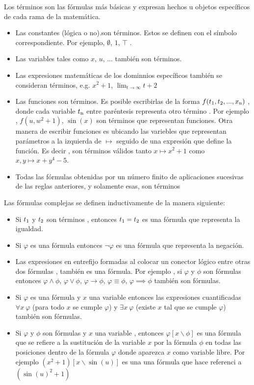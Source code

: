 Los términos son las fórmulas más básicas y expresan hechos u objetos específicos de cada rama de la matemática.

\begin{itemize}
	\item{Las constantes (lógica o no).son términos. Estos se definen con el símbolo correspondiente.  Por ejemplo, $\emptyset$, $1$, $\top$ .}
	\item{Las variables tales como $x$, $u$, ... también son términos.}
	\item{Las expresiones matemáticas de los dominnios específicos también se consideran términos, e.g. $x^2 + 1$, $\lim_{t \to \infty}{t+2}$}
	\item{Las funciones son términos. Es posible escribirlas de la forma $f(t\textsubscript{1}, t\textsubscript{2}, ..., x\textsubscript{n})$ , donde cada variable $t\textsubscript{n}$ entre paréntesis representa otro término . Por ejemplo , $f(u,w^2+1)$, $\sin(x)$ son términos que representan funciones. Otra manera de escribir funciones es ubicando las variebles que representan parámetros a la izquierda de $\mapsto$ seguido de una expresión que define la función. Es decir , son términos válidos tanto $x \mapsto x^2+1$ como $x, y \mapsto x+y^4-5$.}
	\item{Todas las fórmulas  obtenidas por un número finito de aplicaciones sucesivas de las reglas anteriores, y solamente esas, son términos}
\end{itemize}

Las fórmulas complejas se definen inductivamente de la manera siguiente:

\begin{itemize}
	\item{Si $t\textsubscript{1}$ y $t\textsubscript{2}$ son términos , entonces $t\textsubscript{1}=t\textsubscript{2}$ es una fórmula que representa la igualdad.}
	\item{Si $\varphi$ es una fórmula entonces $\neg\varphi$ es una fórmula que representa la negación.}
	\item{Las expresiones en entrefijo formadas al colocar un conector lógico  entre otras dos fórmulas , también es una fórmula. Por ejemplo , si $\varphi$ y $\phi$ son fórmulas entonces $\varphi \land \phi$, $\varphi \lor \phi$, $\varphi \to \phi$, $\varphi \equiv \phi$, $\varphi \implies \phi$ también son fórmulas.}
	\item{Si $\varphi$ es una fórmula y $x$ una variable entonces las expresiones cuantificadas $\forall x\ \varphi$ (para todo $x$ se cumple $\varphi$) y $\exists x\ \varphi$ (existe $x$ tal que se cumple $\varphi$) también son fórmulas.}
	\item{Si $\varphi$ y $\phi$ son fórmulas y $x$ una variable , entonces $\varphi\left[x \backslash \phi\right]$ es una fórmula que se refiere a la sustitución de la variable $x$ por la fórmula $\phi$ en todas las posiciones dentro de la fórmula $\varphi$ donde aparezca $x$ como variable libre. Por ejemplo $(x^2+1)[x \backslash \sin(u)]$ es una una fórmula que hace referenci a $(\sin(u)^2+1)$}
\end{itemize}

